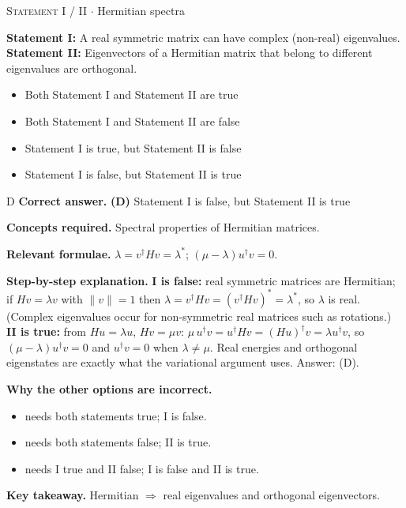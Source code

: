 \documentclass[11pt,a4paper]{article}
\newcommand{\optlabel}[1]{\textbf{(#1)}}
\newcommand{\correctlabel}[1]{\textcolor{okgreen}{\textbf{(#1)}\,\ding{51}}}
\newenvironment{qitem}[1]{\begin{list}{}{\setlength{\leftmargin}{3.3em}\setlength{\labelwidth}{3.1em}%
  \setlength{\labelsep}{0.2em}\setlength{\topsep}{3pt}\setlength{\parsep}{3pt}}\item[\textbf{Q.#1}\hfill]}{\end{list}}
\newcommand{\qsep}{\par\vspace{2pt}{\color{black!15}\hrule}\vspace{4pt}}
\newcommand{\qmeta}[2]{{\footnotesize\color{black!60}\textsc{#1} \;$\cdot$\; #2}\par}
\begin{document}
\begin{qitem}{8}
\qmeta{Statement I / II}{Hermitian spectra}
\textbf{Statement I:} A real symmetric matrix can have complex (non-real) eigenvalues.\\[1mm]
\textbf{Statement II:} Eigenvectors of a Hermitian matrix that belong to different eigenvalues are orthogonal.
\begin{itemize}[leftmargin=2.6em, labelsep=0.4em, itemsep=2pt, topsep=3pt]
\item[\optlabel{A}] Both Statement I and Statement II are true
\item[\optlabel{B}] Both Statement I and Statement II are false
\item[\optlabel{C}] Statement I is true, but Statement II is false
\item[\correctlabel{D}] Statement I is false, but Statement II is true
\end{itemize}
\end{qitem}
\begin{solbox}{D}
\textbf{\color{brand}Correct answer.} \textcolor{okgreen}{\textbf{(D)}} Statement I is false, but Statement II is true

\textbf{\color{brand}Concepts required.} Spectral properties of Hermitian matrices.

\textbf{\color{brand}Relevant formulae.} $\lambda = v^\dagger Hv = \lambda^*$; $(\mu - \lambda)u^\dagger v = 0$.

\textbf{\color{brand}Step-by-step explanation.} \textbf{I is false:} real symmetric matrices are Hermitian; if $Hv = \lambda v$ with $\|v\| = 1$ then
$\lambda = v^\dagger Hv = (v^\dagger Hv)^* = \lambda^*$, so $\lambda$ is real. (Complex eigenvalues occur for non-symmetric real matrices such as rotations.)
\textbf{II is true:} from $Hu = \lambda u$, $Hv = \mu v$: $\mu\,u^\dagger v = u^\dagger Hv = (Hu)^\dagger v = \lambda u^\dagger v$, so $(\mu - \lambda)u^\dagger v = 0$ and
$u^\dagger v = 0$ when $\lambda \neq \mu$. Real energies and orthogonal eigenstates are exactly what the variational argument uses. Answer: (D).

\textbf{\color{brand}Why the other options are incorrect.}
\begin{itemize}[leftmargin=2.4em, itemsep=1pt, topsep=2pt]
\item[\textbf{(A)}] needs both statements true; I is false.
\item[\textbf{(B)}] needs both statements false; II is true.
\item[\textbf{(C)}] needs I true and II false; I is false and II is true.
\end{itemize}
\textbf{\color{brand}Key takeaway.} Hermitian $\Rightarrow$ real eigenvalues and orthogonal eigenvectors.
\end{solbox}
\qsep
\end{document}
